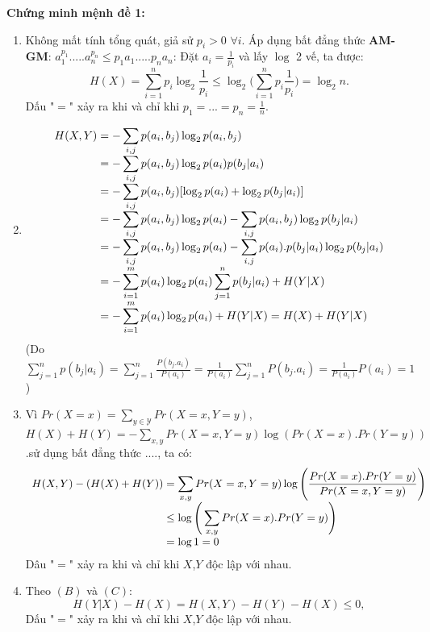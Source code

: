 \documentclass[a4paper, 12pt]{report}
\begin{document}
\textbf{Chứng minh mệnh đề 1: }
\begin{enumerate}[label=(\Alph*)]
\item Không mất tính tổng quát, giả sử $p_{i} > 0$  $\forall i$. Áp dụng bất đẳng thức \textbf{AM-GM}: $a_{1}^{p_{1}}. ... .a_{n}^{p_{n}} \leq p_{1}a_{1}. ... .p_{n}a_{n}$: Đặt $a_{i} = \frac{1}{p_{i}}$ và lấy $\log$ 2 vế, ta được:
\begin{equation*}
H(X) = \displaystyle \sum_{i=1}^{n}p_{i}\log_{2}\frac{1}{p_{i}} \leq \log_{2}\Big(\displaystyle \sum_{i=1}^{n}p_{i}\frac{1}{p_{i}}\Big) = \log_{2}n.
\end{equation*}
Dấu "$=$" xảy ra khi và chỉ khi $p_{1} = ... = p_{n} = \frac{1}{n}$.

\item \begin{equation*}
\begin{array}{l@{}l}
H(X,Y)
	&{}= \displaystyle -\sum_{i,j}p(a_{i},b_{j})\log_{2} p(a_{i},b_{j}) \\
	&{}= \displaystyle -\sum_{i,j}p(a_{i},b_{j})\log_{2} p(a_{i})p(b_{j}|a_{i}) \\ 
	&{}= \displaystyle -\sum_{i,j}p(a_{i},b_{j})[\log_{2}p(a_{i}) + \log_{2}p(b_{j}|a_{i}) ] \\
	&{}= \displaystyle -\sum_{i,j}p(a_{i},b_{j})\log_{2}p(a_{i})  \displaystyle -\sum_{i,j}p(a_{i},b_{j})\log_{2}p(b_{j}|a_{i}) \\
	&{}= \displaystyle -\sum_{i,j}p(a_{i},b_{j})\log_{2}p(a_{i}) \displaystyle -\sum_{i,j}p(a_{i}).p(b_{j}|a_{i})\log_{2}p(b_{j}|a_{i}) \\
	&{}= \displaystyle -\sum_{i=1}^{m}p(a_{i}) \log_{2}p(a_{i}) \displaystyle \sum_{j=1}^{n}p(b_{j}|a_{i}) + H(Y|X) \\
	&{}= \displaystyle -\sum_{i=1}^{m}p(a_{i}) \log_{2}p(a_{i}) + H(Y|X) = H(X) + H(Y|X)  
\end{array}
\end{equation*}
(Do $\displaystyle \sum_{j=1}^{n}p(b_{j}|a_{i}) = \displaystyle \sum_{j=1}^{n}\frac{P(b_{j}.a_{i})}{P(a_{i})} = \frac{1}{P(a_{i})}\displaystyle \sum_{j=1}^{n}P(b_{j}.a_{i})=\frac{1}{P(a_{i})}P(a_{i}) =1  $)
\item Vì $Pr(X=x) = \displaystyle \sum_{y \in \mathscr{Y}}Pr(X=x,Y=y)  $,\\
$H(X) + H(Y) = \displaystyle -\sum_{x,y}Pr(X=x,Y=y)\log(Pr(X=x).Pr(Y=y)) $.sử dụng bất đẳng thức ...., ta có:
\begin{equation*}
\begin{array}{l@{}l}
H(X,Y) - (H(X) + H(Y)) 
	&{}= \displaystyle \sum_{x,y}Pr(X=x,Y=y)\log\Bigg(\frac{Pr(X=x).Pr(Y=y)}{Pr(X=x,Y=y)}\Bigg) \\
	&{}\leq \log \Bigg( \displaystyle \sum_{x,y}Pr(X=x).Pr(Y=y)\Bigg)\\
	&{}= \log 1 =0 
\end{array}
\end{equation*}
Dâu "$=$" xảy ra khi và chỉ khi $X$,$Y$ độc lập với nhau.
\item Theo $(B)$ và $(C)$:
\begin{equation*}
	H(Y|X) - H(X) = H(X,Y) - H(Y) - H(X) \leq 0,
\end{equation*}
Dấu "$=$" xảy ra  khi và chỉ khi $X$,$Y$ độc lập với nhau.


\end{enumerate}
\end{document}
